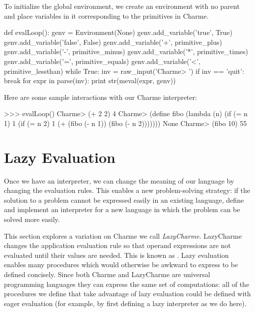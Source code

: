 To initialize the global environment, we create an environment with no parent and place variables in it corresponding to the primitives in Charme.
\begin{pythoncode}
def evalLoop():
    genv = Environment(None)
    genv.add_variable('true', True)
    genv.add_variable('false', False)
    genv.add_variable('+', primitive_plus)
    genv.add_variable('-', primitive_minus)
    genv.add_variable('*', primitive_times)
    genv.add_variable('=', primitive_equals)
    genv.add_variable('<', primitive_lessthan)
    while True:
        inv = raw_input('Charme> ')
        if inv == 'quit': break
        for expr in parse(inv):
            print str(meval(expr, genv))
\end{pythoncode}

Here are some sample interactions with our Charme interpreter:
\begin{pythoninteractions}
>>> evalLoop()
Charme> (+ 2 2)
4
Charme> (define fibo 
                        (lambda (n) 
                            (if (= n 1) 1 
                                (if (= n 2) 1 
                                    (+ (fibo (- n 1)) (fibo (- n 2)))))))
None
Charme> (fibo 10)
55
\end{pythoninteractions}
%

\section{Lazy Evaluation}\label{sec:laziness}

Once we have an interpreter, we can change the meaning of our language by changing the evaluation rules.  This enables a new problem-solving strategy: if the solution to a problem cannot be expressed easily in an existing language, define and implement an interpreter for a new language in which the problem can be solved more easily.  

This section explores a variation on Charme we call \emph{LazyCharme}.  LazyCharme changes the application evaluation rule so that operand expressions are not evaluated until their values are needed.  This is known as .  Lazy evaluation enables many procedures which would otherwise be awkward to express to be defined concisely.  Since both Charme and LazyCharme are universal programming languages they can express the same set of computations: all of the procedures we define that take advantage of lazy evaluation could be defined with eager evaluation (for example, by first defining a lazy interpreter as we do here).

